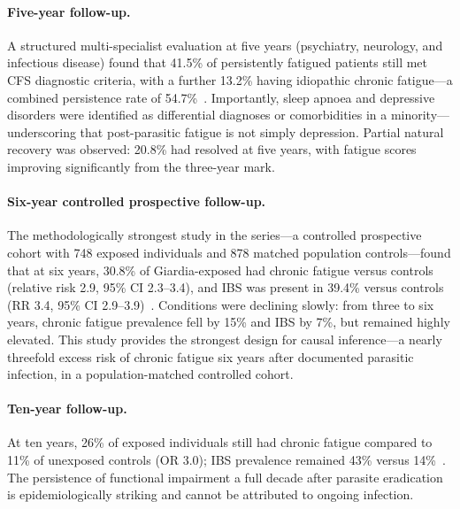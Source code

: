 \paragraph{Five-year follow-up.}
A structured multi-specialist evaluation at five years (psychiatry, neurology, and infectious disease) found that 41.5\% of persistently fatigued patients still met CFS diagnostic criteria, with a further 13.2\% having idiopathic chronic fatigue---a combined persistence rate of 54.7\%~\cite{Morch2013giardia_5yr}. Importantly, sleep apnoea and depressive disorders were identified as differential diagnoses or comorbidities in a minority---underscoring that post-parasitic fatigue is not simply depression. Partial natural recovery was observed: 20.8\% had resolved at five years, with fatigue scores improving significantly from the three-year mark.

\paragraph{Six-year controlled prospective follow-up.}
The methodologically strongest study in the series---a controlled prospective cohort with 748 exposed individuals and 878 matched population controls---found that at six years, 30.8\% of Giardia-exposed had chronic fatigue versus controls (relative risk 2.9, 95\% CI 2.3--3.4), and IBS was present in 39.4\% versus controls (RR 3.4, 95\% CI 2.9--3.9)~\cite{Hanevik2014giardia_6yr}. Conditions were declining slowly: from three to six years, chronic fatigue prevalence fell by 15\% and IBS by 7\%, but remained highly elevated. This study provides the strongest design for causal inference---a nearly threefold excess risk of chronic fatigue six years after documented parasitic infection, in a population-matched controlled cohort.

\paragraph{Ten-year follow-up.}
At ten years, 26\% of exposed individuals still had chronic fatigue compared to 11\% of unexposed controls (OR 3.0); IBS prevalence remained 43\% versus 14\%~\cite{Wensaas2018giardia10yr}. The persistence of functional impairment a full decade after parasite eradication is epidemiologically striking and cannot be attributed to ongoing infection.


